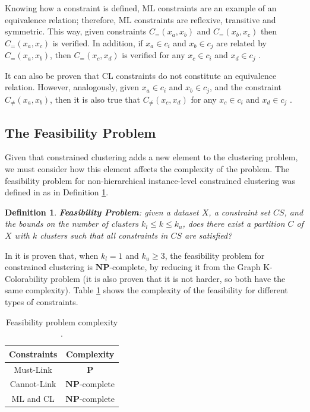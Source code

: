 \documentclass[review]{elsarticle}
\newtheorem{definition}{Definition}
\begin{document}
Knowing how a constraint is defined, ML constraints are an example of an equivalence relation; therefore, ML constraints are reflexive, transitive and symmetric. This way, given constraints $C_=(x_a,x_b)$ and $C_=(x_b,x_c)$ then $C_=(x_a,x_c)$ is verified. In addition, if $x_a \in c_i$ and $x_b \in c_j$ are related by $C_=(x_a,x_b)$, then $C_=(x_c,x_d)$ is verified for any $x_c \in c_i$ and $x_d \in c_j$ \cite{davidson2007survey}.

It can also be proven that CL constraints do not constitute an equivalence relation. However, analogously, given $x_a \in c_i$ and $x_b \in c_j$, and the constraint $C_{\neq}(x_a,x_b)$, then it is also true that $C_{\neq}(x_c,x_d)$ for any $x_c \in c_i$ and $x_d \in c_j$ \cite{davidson2007survey}.

\subsection{The Feasibility Problem} \label{sec:BackFeas}

Given that constrained clustering adds a new element to the clustering problem, we must consider how this element affects the complexity of the problem. The feasibility problem for non-hierarchical instance-level constrained clustering was defined in \cite{davidson2005clustering} as in Definition \ref{def1}.

\begin{definition}

	\textbf{Feasibility Problem}: given a dataset $X$, a constraint set $CS$, and the bounds on the number of clusters $k_l \leq k \leq k_u$, does there exist a partition $C$ of $X$ with $k$ clusters such that all constraints in $CS$ are satisfied? \cite{davidson2005clustering}
	\label{def1}

\end{definition}

In \cite{davidson2005clustering} it is proven that, when $k_l = 1$ and $k_u \ge 3$, the feasibility problem for constrained clustering is $\mathbf{NP}$-complete, by reducing it from the Graph K-Colorability problem (it is also proven that it is not harder, so both have the same complexity). Table \ref{tab:feasibility} shows the complexity of the feasibility for different types of constraints.

\begin{table}[!h]
	\centering
	\setlength{\tabcolsep}{7pt}
	\renewcommand{\arraystretch}{1.2}
		\begin{tabular}{c c}
			\hline
			Constraints & Complexity \\
			\hline
			Must-Link & $\mathbf{P}$\\
			Cannot-Link & $\mathbf{NP}$-complete\\
			ML and CL & $\mathbf{NP}$-complete\\
			\hline

		\end{tabular}%
	\caption{Feasibility problem complexity \cite{davidson2005clustering}.}
	\label{tab:feasibility}
\end{table}
\end{document}
